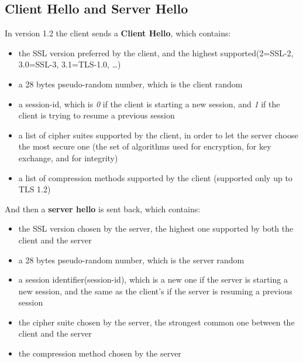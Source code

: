 \subsection{Client Hello and Server Hello}
In version 1.2 the client sends a \textbf{Client Hello}, which
contains:
\begin{itemize}
  \item the SSL version preferred by the client, and the highest
    supported(2=SSL-2, 3.0=SSL-3, 3.1=TLS-1.0, \dots)
  \item a 28 bytes pseudo-random number, which is the client random
  \item a session-id, which is \textit{0} if the client is starting a
    new session, and \textit{1} if the client is trying to resume a
    previous session
  \item a list of cipher suites supported by the client, in order to 
    let the server choose the most secure one (the set of algorithms
    used for encryption, for key exchange, and for integrity)
  \item a list of compression methods supported by the client
    (supported only up to TLS 1.2)
\end{itemize}

And then a \textbf{server hello} is sent back, which contains:
\begin{itemize}
  \item the SSL version chosen by the server, the highest one
    supported by both the client and the server
  \item a 28 bytes pseudo-random number, which is the server random
  \item a session identifier(session-id), which is a new one if the
    server is starting a new session, and the same as the client's if
    the server is resuming a previous session
  \item the cipher suite chosen by the server, the strongest common
    one between the client and the server
  \item the compression method chosen by the server
\end{itemize}


